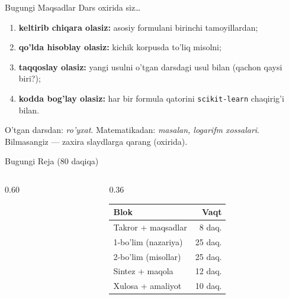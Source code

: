 \documentclass[aspectratio=169,11pt]{beamer}
\begin{document}
\begin{frame}{Bugungi Maqsadlar}
  Dars oxirida siz\ldots
  \begin{enumerate}\setlength\itemsep{5pt}
    \item \textbf{keltirib chiqara olasiz:} asosiy formulani
          birinchi tamoyillardan;
    \item \textbf{qo'lda hisoblay olasiz:} kichik korpusda to'liq misolni;
    \item \textbf{taqqoslay olasiz:} yangi usulni o'tgan darsdagi
          usul bilan (qachon qaysi biri?);
    \item \textbf{kodda bog'lay olasiz:} har bir formula qatorini
          \texttt{scikit-learn} chaqirig'i bilan.
  \end{enumerate}
  \vspace{0.3em}
  \begin{tcolorbox}[defbox,title=Talab qilinadigan bilim]
    \small O'tgan darsdan: \textit{ro'yxat}. Matematikadan:
    \textit{masalan, logarifm xossalari}. Bilmasangiz ---
    zaxira slaydlarga qarang (oxirida).
  \end{tcolorbox}
\end{frame}

\begin{frame}{Bugungi Reja \textnormal{\small (80 daqiqa)}}
  \begin{columns}
    \begin{column}{0.60\textwidth}
      \tableofcontents
    \end{column}
    \begin{column}{0.36\textwidth}
      \begin{center}\small
      \begin{tabular}{lr}
        \toprule
        \textbf{Blok} & \textbf{Vaqt} \\
        \midrule
        Takror + maqsadlar & 8 daq. \\
        1-bo'lim (nazariya) & 25 daq. \\
        2-bo'lim (misollar) & 25 daq. \\
        Sintez + maqola & 12 daq. \\
        Xulosa + amaliyot & 10 daq. \\
        \bottomrule
      \end{tabular}
      \end{center}
    \end{column}
  \end{columns}
\end{frame}
\end{document}

